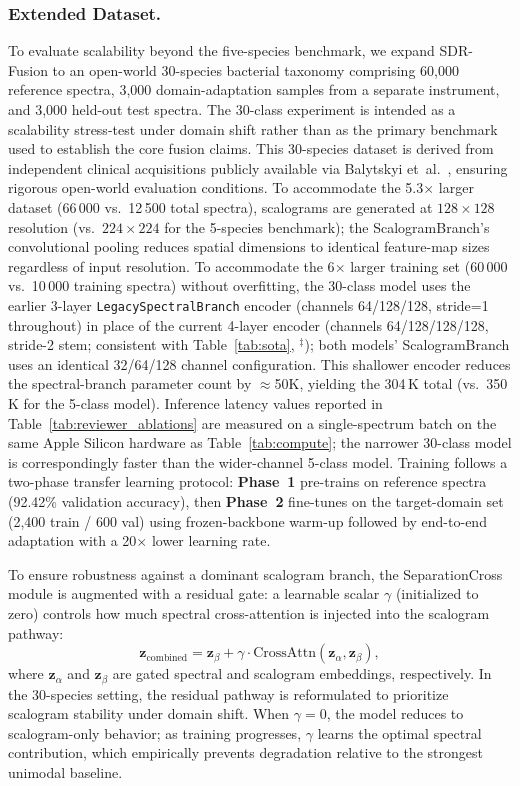 \documentclass[preprint,12pt]{elsarticle}
\begin{document}
\subsubsection{Extended Dataset.}
To evaluate scalability beyond the five-species benchmark, we expand
SDR-Fusion to an open-world 30-species bacterial taxonomy comprising
60,000 reference spectra, 3,000 domain-adaptation samples from a
separate instrument, and 3,000 held-out test spectra. The 30-class experiment is intended as a scalability stress-test under
domain shift rather than as the primary benchmark used to establish
the core fusion claims. This 30-species
dataset is derived from independent clinical acquisitions publicly
available via Balytskyi et~al.~\cite{balytskyi2024open}, ensuring rigorous open-world
evaluation conditions. To accommodate the 5.3$\times$ larger dataset
(66\,000 vs.\ 12\,500 total spectra),
scalograms are generated at $128{\times}128$ resolution (vs.\
$224{\times}224$ for the 5-species benchmark); the
ScalogramBranch's convolutional pooling reduces spatial dimensions to
identical feature-map sizes regardless of input resolution. To
accommodate the 6$\times$ larger training set (60\,000 vs.\ 10\,000
training spectra) without overfitting, the
30-class model uses the earlier 3-layer \texttt{LegacySpectralBranch}
encoder (channels 64/128/128, stride=1 throughout) in place of the
current 4-layer encoder (channels 64/128/128/128, stride-2 stem;
consistent with Table~\ref{tab:sota}, $^\ddagger$); both models'
ScalogramBranch uses an identical 32/64/128 channel configuration.
This shallower encoder reduces the spectral-branch parameter count by
$\approx$50K, yielding the
304\,K total (vs.\ 350\,K for the 5-class model). Inference latency
values reported in
Table~\ref{tab:reviewer_ablations} are measured on a single-spectrum
batch on the same Apple Silicon hardware as Table~\ref{tab:compute};
the narrower 30-class model is correspondingly faster than the
wider-channel 5-class model. Training follows a
two-phase transfer learning protocol: \textbf{Phase~1} pre-trains on
reference spectra (92.42\% validation accuracy), then \textbf{Phase~2}
fine-tunes on the target-domain set (2,400 train / 600 val) using
frozen-backbone warm-up followed by end-to-end adaptation with a
20$\times$ lower learning rate.

To ensure robustness against a dominant scalogram branch, the
SeparationCross module is augmented with a residual gate: a learnable
scalar $\gamma$ (initialized to zero) controls how much spectral
cross-attention is injected into the scalogram pathway:
\begin{equation}
  \mathbf{z}_{\text{combined}} = \mathbf{z}_{\beta}
    + \gamma \cdot \mathrm{CrossAttn}(\mathbf{z}_{\alpha},
    \mathbf{z}_{\beta}),
\end{equation}
where $\mathbf{z}_{\alpha}$ and $\mathbf{z}_{\beta}$ are gated
spectral and scalogram embeddings, respectively. In the 30-species
setting, the residual pathway is reformulated to prioritize scalogram
stability under domain shift. When $\gamma{=}0$, the model reduces to
scalogram-only behavior; as training progresses, $\gamma$ learns the
optimal spectral contribution, which empirically prevents degradation
relative to the strongest unimodal baseline.
\end{document}

